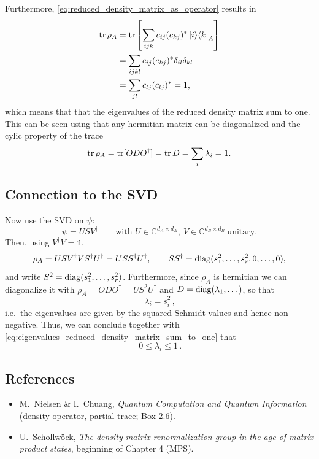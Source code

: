 \documentclass[../../main.tex]{subfiles}
\begin{document}
Furthermore, \cref{eq:reduced_density_matrix_as_operator} results in
\begin{align}
      \operatorname{tr} \rho_A &= \operatorname{tr} \left[ \sum_{ijk} c_{ij} (c_{kj})^* \left\lvert i \right\rangle\!\left\langle k \right\rvert_A \right] \notag \\
      &= \sum_{ijkl} c_{ij} (c_{kj})^* \delta_{il} \delta_{kl} \notag \\
      &= \sum_{jl} c_{lj} (c_{lj})^* = 1 , \notag
\end{align}
which means that that the eigenvalues of the reduced density matrix sum to one. This can be seen using that any hermitian matrix can be diagonalized and the cylic property of the trace
\begin{equation}
      \operatorname{tr} \rho_A = \operatorname{tr} [O D O^\dagger] = \operatorname{tr} D = \sum_i \lambda_i = 1. \label{eq:eigenvalues_reduced_density_matrix_sum_to_one}
\end{equation}


\subsection{Connection to the SVD}

Now use the SVD on $\psi$:
\begin{equation}
\psi=USV^\dagger\qquad\text{with }U\in\mathbb C^{d_A\times d_A},\ V\in\mathbb C^{d_B\times d_B}\ \text{unitary.}
\end{equation}
Then, using $V^\dagger V=\mathds 1$,
\begin{equation}
\rho_A=USV^\dagger VS^\dagger U^\dagger
=USS^\dagger U^\dagger,
\qquad
SS^\dagger=\operatorname{diag}(s_1^2,\dots,s_r^2,0,\dots,0),
\end{equation}
and write $S^2 = \operatorname{diag}(s_1^2,\dots,s_r^2)$.
Furthermore, since $\rho_A$ is hermitian we can diagonalize it with
$\rho_A=ODO^\dagger=US^2 U^\dagger$ and $D=\operatorname{diag}(\lambda_1,\dots)$, so that
\begin{equation}
\boxed{\,\lambda_i=s_i^2\,},
\end{equation}
i.e.\ the eigenvalues are given by the squared Schmidt values and hence non-negative. Thus, we can conclude together with \cref{eq:eigenvalues_reduced_density_matrix_sum_to_one} that 
\begin{equation}
      \boxed{\, 0 \leq \lambda_i \leq 1 \,} . \label{eq:range_of_eigenvalues_of_reduced_density_matrix}
\end{equation}




\subsection{References}
\begin{itemize}
\item M.\ Nielsen \& I.\ Chuang, \emph{Quantum Computation and Quantum Information}
      (density operator, partial trace; Box 2.6).
\item U.\ Schollw\"ock, \emph{The density-matrix renormalization group in the age of matrix
      product states}, beginning of Chapter 4 (MPS).
\end{itemize}
\end{document}
